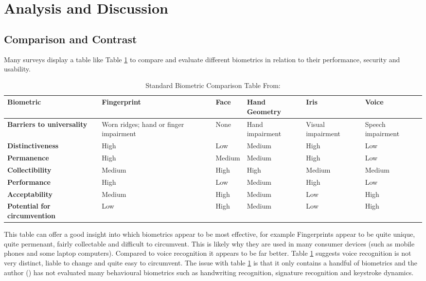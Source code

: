 \documentclass[12pt]{article}
\begin{document}
	\section{Analysis and Discussion}
	\label{sect_analysis}
	\subsection{Comparison and Contrast}
	Many surveys display a table like Table \ref{tab:common_comparison} to compare and evaluate different biometrics in relation to their performance, security and usability.

    \begin{table}[H]
        \centering
        \begin{tabular}{|p{3cm}|p{2.5cm}|p{1.5cm}|p{2cm}|p{2cm}|p{2cm}|}
            \hline
             \textbf{Biometric} & \textbf{Fingerprint} & \textbf{Face} & \textbf{Hand Geometry} & \textbf{Iris} & \textbf{Voice} \\
             \hline
             \textbf{Barriers to universality} & Worn ridges; hand or finger impairment & None & Hand impairment & Visual impairment & Speech impairment \\\hline
             \textbf{Distinctiveness} & High & Low & Medium & High & Low\\\hline
             \textbf{Permanence} & High & Medium & Medium & High & Low\\\hline
             \textbf{Collectibility} & Medium & High & High & Medium & Medium\\\hline
             \textbf{Performance} & High & Low & Medium & High & Low \\\hline
             \textbf{Acceptability} & Medium & High & Medium & Low & High \\\hline
             \textbf{Potential for circumvention} & Low & High & Medium & Low & High \\\hline
        \end{tabular}
        \caption{Standard Biometric Comparison Table From: \cite{prabhakar2003biometric}}
        \label{tab:common_comparison}
    \end{table}
	
	This table can offer a good insight into which biometrics appear to be most effective, for example Fingerprints appear to be quite unique, quite permenant, fairly collectable and difficult to circumvent. This is likely why they are used in many consumer devices (such as mobile phones and some laptop computers). Compared to voice recognition it appears to be far better. Table \ref{tab:common_comparison} suggests voice recognition is not very distinct, liable to change and quite easy to circumvent.
	The issue with table \ref{tab:common_comparison} is that it only contains a handful of biometrics and the author (\cite{prabhakar2003biometric}) has not evaluated many behavioural biometrics such as handwriting recognition, signature recognition and keystroke dynamics.
	
\end{document}
